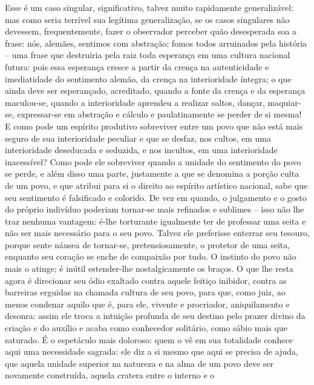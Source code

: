 \begin{enumerate}
    Esse é um caso singular, significativo, talvez muito rapidamente
    generalizável: mas como seria terrível sua legítima generalização,
    se os casos singulares não devessem, frequentemente, fazer o
    observador perceber quão desesperada soa a frase: nós, alemães,
    sentimos com abstração; fomos todos arruinados pela história -- uma
    frase que destruiria pela raiz toda esperança em uma cultura
    nacional futura: pois essa esperança cresce a partir da crença na
    autenticidade e imediatidade do sentimento alemão, da crença na
    interioridade íntegra; o que ainda deve ser esperançado, acreditado,
    quando a fonte da crença e da esperança maculou-se, quando a
    interioridade aprendeu a realizar saltos, dançar, maquiar-se,
    expressar-se em abstração e cálculo e paulatinamente se perder de si
    mesma! E como pode um espírito produtivo sobreviver entre um povo
    que não está mais seguro de sua interioridade peculiar e que se
    desfaz, nos cultos, em uma interioridade deseducada e seduzida, e
    nos incultos, em uma interioridade inacessível? Como pode ele
    sobreviver quando a unidade do sentimento do povo se perde, e além
    disso uma parte, justamente a que se denomina a porção culta de um
    povo, e que atribui para si o direito ao espírito artístico
    nacional, sabe que seu sentimento é falsificado e colorido. De vez
    em quando, o julgamento e o gosto do próprio indivíduo poderiam
    tornar-se mais refinados e sublimes -- isso não lhe traz nenhuma
    vantagem: é-lhe torturante igualmente ter de professar uma seita e
    não ser mais necessário para o seu povo. Talvez ele preferisse
    enterrar seu tesouro, porque sente náusea de tornar-se,
    pretensiosamente, o protetor de uma seita, enquanto seu coração se
    enche de compaixão por tudo. O instinto do povo não mais o atinge; é
    inútil estender-lhe nostalgicamente os braços. O que lhe resta agora
    é direcionar seu ódio exaltado contra aquele feitiço inibidor,
    contra as barreiras erguidas na chamada cultura de seu povo, para
    que, como juiz, ao menos condenar aquilo que é, para ele, vivente e
    procriador, aniquilamento e desonra: assim ele troca a intuição
    profunda de seu destino pelo prazer divino da criação e do auxílio e
    acaba como conhecedor solitário, como sábio mais que saturado. É o
    espetáculo mais doloroso: quem o vê em sua totalidade conhece aqui
    uma necessidade sagrada: ele diz a si mesmo que aqui se precisa de
    ajuda, que aquela unidade superior na natureza e na alma de um povo
    deve ser novamente construída, aquela cratera entre o interno e o

\end{enumerate}
